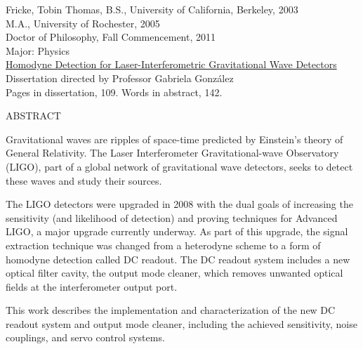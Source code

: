 \documentclass{article}
\begin{document}
\noindent 
Fricke, Tobin Thomas, B.S., University of California, Berkeley, 2003\\
M.A., University of Rochester, 2005\\
Doctor of Philosophy, Fall Commencement, 2011\\
Major: Physics\\
\underline{Homodyne Detection for Laser-Interferometric Gravitational Wave Detectors}\\
Dissertation directed by Professor Gabriela Gonz\'alez\\
Pages in dissertation, 109.  Words in abstract, 142.\\

\noindent\centerline{ABSTRACT}

Gravitational waves are ripples of space-time predicted by Einstein's
theory of General Relativity.  The Laser Interferometer
Gravitational-wave Observatory (LIGO), part of a global network of
gravitational wave detectors, seeks to detect these waves and study
their sources.

The LIGO detectors were upgraded in 2008 with the dual goals of
increasing the sensitivity (and likelihood of detection) and proving
techniques for Advanced LIGO, a major upgrade currently underway.  As
part of this upgrade, the signal extraction technique was changed from
a heterodyne scheme to a form of homodyne detection called DC readout.
The DC readout system includes a new optical filter cavity, the output
mode cleaner, which removes unwanted optical fields at the
interferometer output port.

This work describes the implementation and characterization of the new
DC readout system and output mode cleaner, including the achieved
sensitivity, noise couplings, and servo control systems.
\end{document}
